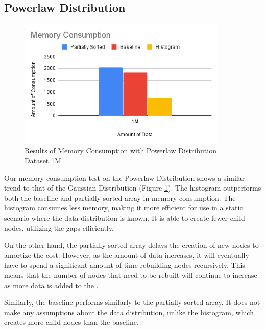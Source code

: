 \subsection{Powerlaw Distribution}
\begin{figure}[H]
    \centering
    \includegraphics[width=100mm,scale=1]{Figures/MemoryPowerlaw.png}
    \caption{
     Results of Memory Consumption with Powerlaw Distribution Dataset 1M
    }
    \label{fig:MemoryPowerlaw}
\end{figure}
Our memory consumption test on the Powerlaw Distribution shows a similar trend to that of the Gaussian Distribution (Figure \ref{fig:MemoryPowerlaw}). The histogram outperforms both the baseline and partially sorted array in memory consumption. The histogram consumes less memory, making it more efficient for use in a static scenario where the data distribution is known. It is able to create fewer child nodes, utilizing the \textsf{gaps} efficiently.

On the other hand, the partially sorted array delays the creation of new nodes to amortize the cost. However, as the amount of data increases, it will eventually have to spend a significant amount of time rebuilding nodes recursively. This means that the number of nodes that need to be rebuilt will continue to increase as more data is added to the \learnindex.

Similarly, the baseline performs similarly to the partially sorted array. It does not make any assumptions about the data distribution, unlike the histogram, which creates more child nodes than the baseline.

